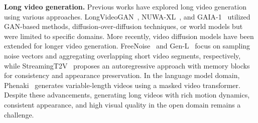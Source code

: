 \textbf{Long video generation.}
Previous works have explored long video generation using various approaches. LongVideoGAN~\cite{brooks2022generating}, NUWA-XL~\cite{yin2023nuwa}, and GAIA-1~\cite{hu2023gaia} utilized GAN-based methods, diffusion-over-diffusion techniques, or world models but were limited to specific domains. More recently, video diffusion models have been extended for longer video generation. FreeNoise~\cite{qiu2023freenoise} and Gen-L~\cite{wang2023gen_L} focus on sampling noise vectors and aggregating overlapping short video segments, respectively, while StreamingT2V~\cite{streamingt2v} proposes an autoregressive approach with memory blocks for consistency and appearance preservation. In the language model domain, Phenaki~\cite{villegas2022phenaki} generates variable-length videos using a masked video transformer. Despite these advancements, generating long videos with rich motion dynamics, consistent appearance, and high visual quality in the open domain remains a challenge.